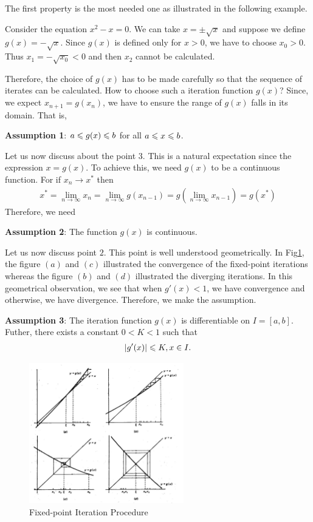 The first property is the most needed one as illustrated in the following example.
\begin{example}{}{}
    Consider the equation $x^2-x=0$. We can take $x=\pm \sqrt{x}$ and suppose we define $g(x)=-\sqrt{x}$.
    Since $g(x)$ is defined only for $x>0$, we have to choose $x_0>0$. Thus $x_1=-\sqrt{x_0}<0$ and then $x_2$ cannot be calculated.
\end{example}

Therefore, the choice of $g(x)$ has to be made carefully so that the sequence of iterates can be calculated.
How to choose such a iteration function $g(x)$? 
Since, we expect $x_{n+1}=g(x_n)$, we have to ensure the range of $g(x)$ falls in its domain.
That is,
\par
\textbf{Assumption 1}: $a\leqslant g(x)\leqslant b$ for all $a\leqslant x\leqslant b$.
\par 
Let us now discuss about the point $3$. This is a natural expectation since the expression 
$x=g(x)$. To achieve this, we need $g(x)$ to be a continuous function. For if $x_n\rightarrow x^*$ then 
\begin{align*}
    x^*=\lim_{n\rightarrow \infty}x_n=\lim_{n\rightarrow \infty} g(x_{n-1}) = g(\lim_{n\rightarrow \infty} x_{n-1})=g(x^*)
\end{align*}
Therefore, we need 
\par
\textbf{Assumption 2}: The function $g(x)$ is continuous.
\par
Let us now discuss point $2$. This point is well understood geometrically. 
In Fig\ref{img:Fixed-point Iteration Procedure}, 
the figure $(a)$ and $(c)$ illustrated the convergence of the fixed-point iterations 
whereas the figure $(b)$ and $(d)$ illustrated the diverging iterations.
In this geometrical observation, we see that when $g'(x)<1$, 
we have convergence and otherwise, we have divergence. Therefore, we make the assumption.

\textbf{Assumption 3}: The iteration function $g(x)$ is differentiable on $I=[a,b]$.
Futher, there exists a constant $0<K<1$ such that
\begin{align*}
    |g'(x)|\leqslant K,x\in I.
\end{align*}

\begin{figure}[htbp]
    \centering
    \includegraphics[width=0.6\textwidth]{figure/ne1_fixed_point_iteration_procedure.png}
    \caption{Fixed-point Iteration Procedure}
    \label{img:Fixed-point Iteration Procedure}
\end{figure}


